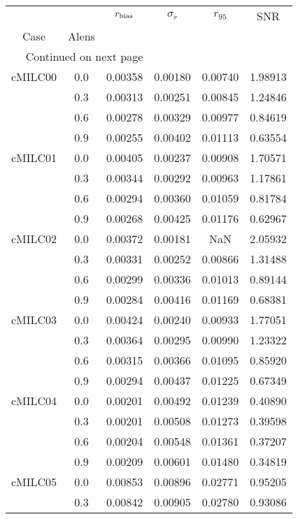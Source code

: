 \begin{longtable}{cccccc}
\toprule
        &     &  $r_{\rm bias}$  &  $\sigma_r$ &  $r_{95}$ &     SNR \\
Case & Alens &                  &             &           &         \\
\midrule
\endhead
\midrule
\multicolumn{3}{r}{{Continued on next page}} \\
\midrule
\endfoot

\bottomrule
\endlastfoot
cMILC00 & 0.0 & 0.00358 & 0.00180 & 0.00740 & 1.98913 \\
        & 0.3 & 0.00313 & 0.00251 & 0.00845 & 1.24846 \\
        & 0.6 & 0.00278 & 0.00329 & 0.00977 & 0.84619 \\
        & 0.9 & 0.00255 & 0.00402 & 0.01113 & 0.63554 \\
cMILC01 & 0.0 & 0.00405 & 0.00237 & 0.00908 & 1.70571 \\
        & 0.3 & 0.00344 & 0.00292 & 0.00963 & 1.17861 \\
        & 0.6 & 0.00294 & 0.00360 & 0.01059 & 0.81784 \\
        & 0.9 & 0.00268 & 0.00425 & 0.01176 & 0.62967 \\
cMILC02 & 0.0 & 0.00372 & 0.00181 & NaN & 2.05932 \\
        & 0.3 & 0.00331 & 0.00252 & 0.00866 & 1.31488 \\
        & 0.6 & 0.00299 & 0.00336 & 0.01013 & 0.89144 \\
        & 0.9 & 0.00284 & 0.00416 & 0.01169 & 0.68381 \\
cMILC03 & 0.0 & 0.00424 & 0.00240 & 0.00933 & 1.77051 \\
        & 0.3 & 0.00364 & 0.00295 & 0.00990 & 1.23322 \\
        & 0.6 & 0.00315 & 0.00366 & 0.01095 & 0.85920 \\
        & 0.9 & 0.00294 & 0.00437 & 0.01225 & 0.67349 \\
cMILC04 & 0.0 & 0.00201 & 0.00492 & 0.01239 & 0.40890 \\
        & 0.3 & 0.00201 & 0.00508 & 0.01273 & 0.39598 \\
        & 0.6 & 0.00204 & 0.00548 & 0.01361 & 0.37207 \\
        & 0.9 & 0.00209 & 0.00601 & 0.01480 & 0.34819 \\
cMILC05 & 0.0 & 0.00853 & 0.00896 & 0.02771 & 0.95205 \\
        & 0.3 & 0.00842 & 0.00905 & 0.02780 & 0.93086 \\

\end{longtable}
